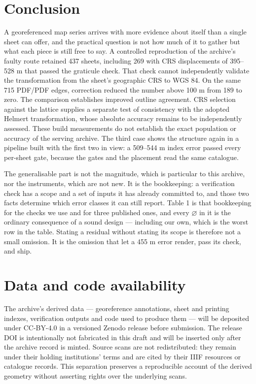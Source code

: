 \documentclass[11pt,a4paper]{article}
\begin{document}
\section{Conclusion}

A georeferenced map series arrives with more evidence about itself than a single sheet can offer, and the practical question is not how much of it to gather but what each piece is still free to say. A controlled reproduction of the archive's faulty route retained 437 sheets, including 269 with CRS displacements of 395–528 m that passed the graticule check. That check cannot independently validate the transformation from the sheet's geographic CRS to WGS 84. On the same 715 PDF/PDF edges, correction reduced the number above 100 m from 189 to zero. The comparison establishes improved outline agreement. CRS selection against the lattice supplies a separate test of consistency with the adopted Helmert transformation, whose absolute accuracy remains to be independently assessed. These build measurements do not establish the exact population or accuracy of the serving archive. The third case shows the structure again in a pipeline built with the first two in view: a 509–544 m index error passed every per-sheet gate, because the gates and the placement read the same catalogue.

The generalisable part is not the magnitude, which is particular to this archive, nor the instruments, which are not new. It is the bookkeeping: a verification check has a scope and a set of inputs it has already committed to, and those two facts determine which error classes it can still report. Table 1 is that bookkeeping for the checks we use and for three published ones, and every \ensuremath{\varnothing} in it is the ordinary consequence of a sound design — including our own, which is the worst row in the table. Stating a residual without stating its scope is therefore not a small omission. It is the omission that let a 455 m error render, pass its check, and ship.

\section{Data and code availability}

The archive's derived data — georeference annotations, sheet and printing indexes, verification outputs and code used to produce them — will be deposited under CC-BY-4.0 in a versioned Zenodo release before submission. The release DOI is intentionally not fabricated in this draft and will be inserted only after the archive record is minted. Source scans are not redistributed: they remain under their holding institutions' terms and are cited by their IIIF resources or catalogue records. This separation preserves a reproducible account of the derived geometry without asserting rights over the underlying scans.
\end{document}
